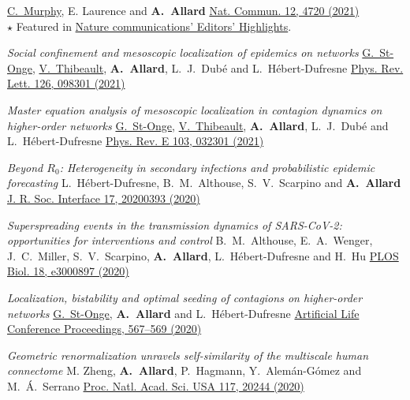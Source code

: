 \documentclass[11pt]{article}
\makeatletter
\newcommand{\reversearabic}[1]{\expandafter\@reversearabic\csname c@#1\endcsname}
\newcommand{\@reversearabic}[1]{%
  \number\numexpr\getrefnumber{this@etaremune@\romannumeral\c@etaremune}-#1+1\relax
}
\newcounter{etaremune}
\newenvironment{etaremune}[1][]{%
  \stepcounter{etaremune}%
  \begin{enumerate}[label=\reversearabic*.,#1]%
}{%
  \edef\@currentlabel{\the\csname c@\@enumctr\endcsname}%
  \label{this@etaremune@\romannumeral\c@etaremune}%
  \end{enumerate}%
}
\makeatother
\begin{document}
\begin{etaremune}[itemsep=0.5em, label={[A\reversearabic*]}]
{  \uline{C.~Murphy}, E. Laurence and \textbf{A.~Allard}\split
  \href{https://doi.org/10.1038/s41467-021-24732-2}{Nat. Commun. 12, 4720 (2021)}\\
  {\footnotesize $\star$ Featured in \href{https://www.nature.com/ncomms/editorshighlights}{Nature communications' Editors' Highlights}.}}
%
  \item \parbox[t]{\textwidth-30pt}{\textit{Social confinement and mesoscopic localization of epidemics on networks}\split
  \uline{G.~St-Onge}, \uline{V.~Thibeault}, \textbf{A.~Allard}, L.~J.~Dub\'e and L.~H\'ebert-Dufresne\split
  \href{http://doi.org/10.1103/PhysRevLett.126.098301}{Phys. Rev. Lett. 126, 098301 (2021)}}
%
  \item \parbox[t]{\textwidth-30pt}{\textit{Master equation analysis of mesoscopic localization in contagion dynamics on higher-order networks}\split
  \uline{G.~St-Onge}, \uline{V.~Thibeault}, \textbf{A.~Allard}, L.~J.~Dub\'e and L.~H\'ebert-Dufresne\split
  \href{http://doi.org/10.1103/PhysRevE.103.032301}{Phys. Rev. E 103, 032301 (2021)}}
  \item \parbox[t]{\textwidth-30pt}{\textit{Beyond $R_0$: Heterogeneity in secondary infections and probabilistic epidemic forecasting}\split
  L.~H\'ebert-Dufresne, B.~M.~Althouse, S.~V.~Scarpino and \textbf{A.~Allard}\split
  \href{https://doi.org/10.1098/rsif.2020.0393}{J. R. Soc. Interface 17, 20200393 (2020)}}
%
  \item \parbox[t]{\textwidth-30pt}{\textit{Superspreading events in the transmission dynamics of SARS-CoV-2: opportunities for interventions and control}\split
  B.~M.~Althouse, E.~A.~Wenger, J.~C.~Miller, S.~V.~Scarpino, \textbf{A.~Allard}, L.~H\'ebert-Dufresne and H.~Hu\split
  \href{https://doi.org/10.1371/journal.pbio.3000897}{PLOS Biol. 18, e3000897 (2020)}}
%
  \item \parbox[t]{\textwidth-30pt}{\textit{Localization, bistability and optimal seeding of contagions on higher-order networks}\split
  \uline{G.~St-Onge}, \textbf{A.~Allard} and L.~H\'ebert-Dufresne\split
  \href{https://doi.org/10.1162/isal_a_00327}{Artificial Life Conference Proceedings, 567--569 (2020)}}
%
  \item \parbox[t]{\textwidth-30pt}{\textit{Geometric renormalization unravels self-similarity of the multiscale human connectome}\split
  M. Zheng, \textbf{A.~Allard}, P.~Hagmann, Y.~Alem\'an-G\'omez and M.~\'A.~Serrano\split
  \href{http://doi.org/10.1073/pnas.1922248117}{Proc. Natl. Acad. Sci. USA 117, 20244 (2020)}}

\end{etaremune}
\end{document}

